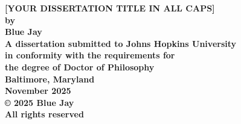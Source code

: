 \begin{titlepage}
\thispagestyle{empty}
\begin{center}
    \doublespacing
    \vspace*{1.5in} 
    {\bf \Large [YOUR DISSERTATION TITLE IN ALL CAPS]} \\ 
    \vfill 
    {\bf \Large by} \\ 
    {\bf \Large Blue Jay}\\ 
    \vfill 
    {\bf \large A dissertation submitted to Johns Hopkins University\\ in conformity with the requirements for\\ the degree of Doctor of Philosophy\\} 
    \vfill 
    {\bf \large Baltimore, Maryland} \\ 
    {\bf \large November 2025} \\ 
    \vfill
    {\bf \large \copyright{} 2025 Blue Jay } \\ 
    {\bf \large All rights reserved} \\ 
    \vfill
\end{center}
\newpage  
\end{titlepage}
